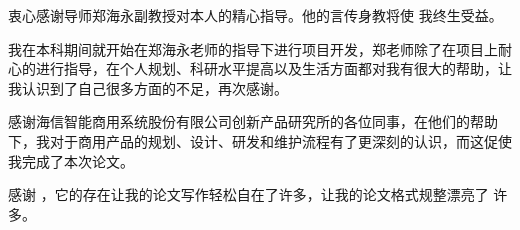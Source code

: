 \begin{acknowledgement}
  衷心感谢导师郑海永副教授对本人的精心指导。他的言传身教将使
  我终生受益。

  我在本科期间就开始在郑海永老师的指导下进行项目开发，郑老师除了在项目上耐心的进行指导，在个人规划、科研水平提高以及生活方面都对我有很大的帮助，让我认识到了自己很多方面的不足，再次感谢。



  感谢海信智能商用系统股份有限公司创新产品研究所的各位同事，在他们的帮助下，我对于商用产品的规划、设计、研发和维护流程有了更深刻的认识，而这促使我完成了本次论文。

  感谢 \thuthesis，它的存在让我的论文写作轻松自在了许多，让我的论文格式规整漂亮了
  许多。
\end{acknowledgement}
